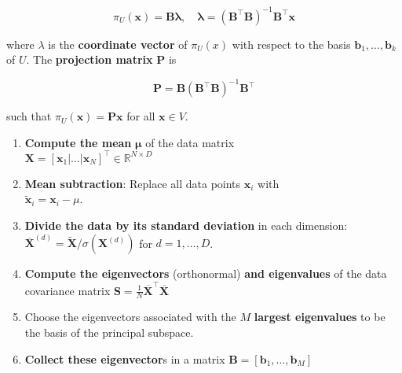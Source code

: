 \begin{minipage}{0.48\textwidth}
	\[
		\pi_{U}(\boldsymbol{x}) =\boldsymbol{B} \boldsymbol{\lambda}, \quad \boldsymbol{\lambda}=\left(\boldsymbol{B}^{\top} \boldsymbol{B}\right)^{-1} \boldsymbol{B}^{\top} \boldsymbol{x} 
	\]
	
	where $\lambda$ is the \textbf{coordinate vector} of $\pi_{U}(x)$ with respect to the basis $\boldsymbol{b}_{1}, \ldots, \boldsymbol{b}_{k}$ of $U$. The \textbf{projection matrix} $\boldsymbol{P}$ is
	
	\[
		\boldsymbol{P}=\boldsymbol{B}\left(\boldsymbol{B}^{\top} \boldsymbol{B}\right)^{-1} \boldsymbol{B}^{\top}
	\]
	
	such that $\pi_{U}(\boldsymbol{x})=\boldsymbol{P} \boldsymbol{x}$ for all $\boldsymbol{x} \in V$.
	
	\vspace{0.5cm}
	
	
	
	\vspace{0.15cm}
	
	\begin{enumerate}
		\item \textbf{Compute the mean} $\boldsymbol{\mu}$ of the data matrix \\ $\boldsymbol{X}=\left[\boldsymbol{x}_{1}|\ldots| \boldsymbol{x}_{N}\right]^{\top} \in \mathbb{R}^{N \times D}$
		      
		\item \textbf{Mean subtraction}: Replace all data points $\boldsymbol{x}_{i}$ with \\ $\tilde{\boldsymbol{x}}_{i}=\boldsymbol{x}_{i}-\mu$.
		      
		\item \textbf{Divide the data by its standard deviation} in each dimension: $\overline{\boldsymbol{X}}^{(d)}=\tilde{\boldsymbol{X}} / \sigma\left(\boldsymbol{X}^{(d)}\right)$ for $d=1, \ldots, D$.
		      
		\item \textbf{Compute the eigenvectors} (orthonormal) \textbf{and eigenvalues} of the data covariance matrix $\boldsymbol{S}=\frac{1}{N} \overline{\boldsymbol{X}}^{\top} \overline{\boldsymbol{X}}$
		      
		\item Choose the eigenvectors associated with the $M$ \textbf{largest eigenvalues} to be the basis of the principal subspace.
		      
		\item \textbf{Collect these eigenvector}s in a matrix $\boldsymbol{B}=\left[\boldsymbol{b}_{1}, \ldots, \boldsymbol{b}_{M}\right]$
		      

\end{enumerate}
\end{minipage}
